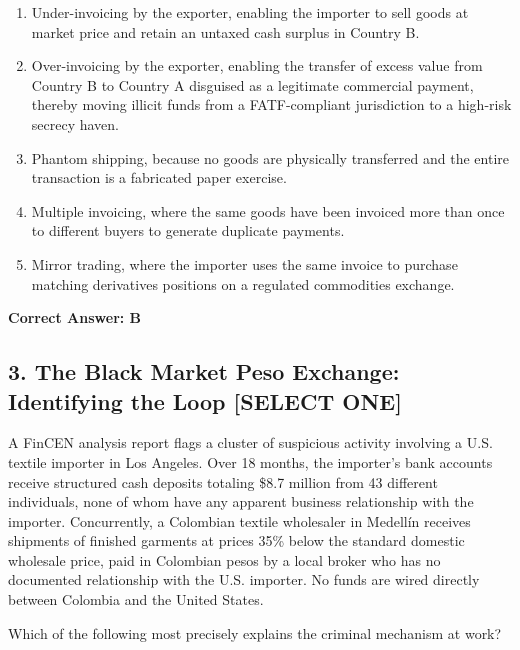 \documentclass[11pt,a4paper]{article}
\begin{document}
	\begin{enumerate}[label=\Alph*.]
		\item Under-invoicing by the exporter, enabling the importer to sell goods at market price and retain an untaxed cash surplus in Country B.
		\item Over-invoicing by the exporter, enabling the transfer of excess value from Country B to Country A disguised as a legitimate commercial payment, thereby moving illicit funds from a FATF-compliant jurisdiction to a high-risk secrecy haven.
		\item Phantom shipping, because no goods are physically transferred and the entire transaction is a fabricated paper exercise.
		\item Multiple invoicing, where the same goods have been invoiced more than once to different buyers to generate duplicate payments.
		\item Mirror trading, where the importer uses the same invoice to purchase matching derivatives positions on a regulated commodities exchange.
	\end{enumerate}
	\textbf{Correct Answer: B}
	
	\subsection{3. The Black Market Peso Exchange: Identifying the Loop \textnormal{[SELECT ONE]}}
	
	A FinCEN analysis report flags a cluster of suspicious activity involving a U.S. textile importer in Los Angeles. Over 18 months, the importer's bank accounts receive structured cash deposits totaling \$8.7 million from 43 different individuals, none of whom have any apparent business relationship with the importer. Concurrently, a Colombian textile wholesaler in Medell\'in receives shipments of finished garments at prices 35\% below the standard domestic wholesale price, paid in Colombian pesos by a local broker who has no documented relationship with the U.S. importer. No funds are wired directly between Colombia and the United States.
	
	Which of the following most precisely explains the criminal mechanism at work?
	
\end{document}
